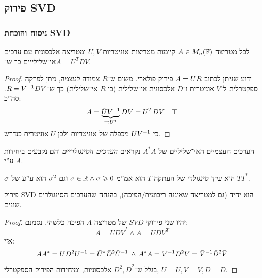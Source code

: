 \documentclass[name=רשימות אלגברה לינארית 2א]{../../../tex/classes/megasumPreamble}
\begin{document}
	\subsection{פירוק SVD}
	\subsubsection{ניסוח והוכחת SVD}
	\begin{Theorem}
		לכל מטריצה $A \in M_n(\mathbb{F})$ קיימות מטריצות אוניטריות $U, V$ ומטריצה אלכסונית עם ערכים אי־שלילייים כך ש־$A = U^TDV$. 
	\end{Theorem}
	\begin{proof}
		ידוע שניתן לכתוב $A = \tilde UR$ פירוק פולארי. משום ש־$R$ צמודה לעצמה, ניתן לפרקה ספקטרלית ל־$V$ אוניטרית ו־$D$ אלכסונית אי־שלילית (כי $R$ אי־שלילית) כך ש־$R = V^{-1} DV$. סה''כ: 
		\[ A = \underbrace{\tilde UV^{-1}}_{\eqqcolon U^T} DV = U^TDV \quad \top \]
		כי $\tilde UV^{-1}$ מכפלה של אוניטריות ולכן $U$ אוניטרית כנדרש. 
	\end{proof}
	
	
	\begin{Definition}
		הערכים העצמיים האי־שליליים של $A^*A$ נקראים \textit{הערכים הסינגולריים} והם נקבעים ביחידות ע''י $A$. 
	\end{Definition}
	\begin{Definition}
		$\sigma$ הוא \textit{ערך סינגולרי} של העתקה $T$ הוא אמ''מ $\sigma \in \mathbb{R} \land \sigma \geqslant 0$ וגם $\sigma^{2}$ הוא ע''ע של $TT^*$. 
	\end{Definition}
	
	\begin{Theorem}
		פירוק SVD הוא יחיד (גם למטריצה שאיננה ריבועית/הפיכה), בהנחה שהערכים הסינגולרים שונים. 
	\end{Theorem}
	\begin{proof}
		יהיו שני פירוקי $SVD$ של מטריצה $A$ הפיכה כלשהי, נסמנם: 
		\[ A = \bar U \bar D \bar V^T \land A = UDV^T \]
		אזי: 
		\[ AA^* = UD^2 U^{-1} = \bar U^* \bar D^2 \bar U^{-1} \,\land\, A^*A = V^{-1} D^2 V = \bar V^{-1} \bar D^2 \bar V \]
		בגלל ש־$D^2, \bar D^2$ אלכסוניות, ומיחידות הפירוק הספקטרלי, $U = \bar U, V = \bar V, D = \bar D$. 
	\end{proof}
	
\end{document}
